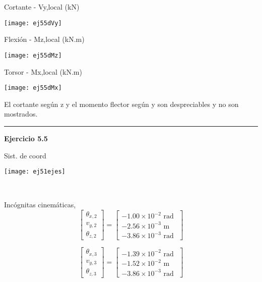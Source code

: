 Cortante - Vy,local (kN)

\begin{center}
	\texttt{[image: ej55dVy]}
\end{center}

Flexión - Mz,local (kN.m)

\begin{center}
	\texttt{[image: ej55dMz]}
\end{center}


Torsor - Mx,local (kN.m)


\begin{center}
	\texttt{[image: ej55dMx]}
\end{center}

El cortante según z y el momento flector según y son despreciables y no son mostrados. 








\vspace{5mm}

\hrule 
\vspace{5mm}




\textbf{Ejercicio 5.5}\\

\begin{minipage}{0.45\textwidth}
	Sist. de coord
	
	\texttt{[image: ej51ejes]}
\end{minipage}
~
\begin{minipage}{0.45\textwidth}
Incógnitas cinemáticas,
$$
\left[
\begin{matrix}
\theta_{x,2} \\
v_{y,2} \\
\theta_{z,2}
\end{matrix}
\right]
=
\left[
\begin{matrix}
-1.00\times 10^{-2} \text{ rad }\\
-2.56\times 10^{-3} \text{ m }\\
-3.86\times 10^{-3} \text{ rad }
\end{matrix}
\right]
$$

$$
\left[
\begin{matrix}
\theta_{x,3} \\
v_{y,3} \\
\theta_{z,3}
\end{matrix}
\right]
=
\left[
\begin{matrix}
-1.39\times 10^{-2} \text{ rad }\\
-1.52\times 10^{-2} \text{ m }\\
-3.86\times 10^{-3} \text{ rad }
\end{matrix}
\right]
$$
\end{minipage}

